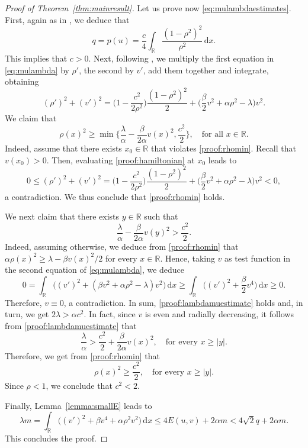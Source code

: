 \documentclass[11pt]{article}
\newcommand{\R}{\mathbb{R}}
\renewcommand{\d}{\,\mathrm{d}}
\theoremstyle{plain}
\theoremstyle{definition}
\theoremstyle{remark}
\numberwithin{equation}{section}
\begin{document}
{\begin{proof}[Proof of Theorem~\ref{thm:mainresult}]
Let us prove now \eqref{eq:mulambdaestimates}. First, again as in \cite{dLMar2022}, we deduce that
    \[q=p(u)=\frac{c}{4}\int_\R \frac{(1-\rho^2)^2}{\rho^2}\d x.\]
    This implies that $c>0$. Next, following \cite{Maris2006}, we multiply the first equation in \eqref{eq:mulambda} by $\rho'$, the second by $v'$, add them together and integrate, obtaining 
    \begin{equation}\label{proof:hamiltonian}
    (\rho')^2+(v')^2=\Big(1-\frac{c^2}{2\rho^2}\Big)\frac{(1-\rho^2)^2}{2} + \Big(\frac{\beta}{2}v^2+\alpha\rho^2-\lambda\Big)v^2.
    \end{equation}
    We claim that
    \begin{equation}\label{proof:rhomin}
    \rho(x)^2\geq \min\Big\{\frac{\lambda}{\alpha}-\frac{\beta}{2\alpha}v(x)^2,\frac{c^2}{2}\Big\},\quad\text{for all }x\in\R.
    \end{equation}
    Indeed, assume that there exists $x_0\in\R$ that violates \eqref{proof:rhomin}. Recall that $v(x_0)>0$. Then, evaluating \eqref{proof:hamiltonian} at $x_0$ leads to 
    \[0\leq (\rho')^2+(v')^2=\Big(1-\frac{c^2}{2\rho^2}\Big)\frac{(1-\rho^2)^2}{2} + \Big(\frac{\beta}{2}v^{2}+\alpha\rho^2-\lambda\Big)v^2< 0,\]
    a contradiction. We thus conclude that \eqref{proof:rhomin} holds.

    We next claim that there exists $y\in\R$ such that
    \begin{equation}\label{proof:lambdamuestimate}
        \frac{\lambda}{\alpha} - \frac{\beta}{2\alpha}v(y)^{2}>\frac{c^2}{2}.
    \end{equation}
    Indeed, assuming otherwise, we deduce from \eqref{proof:rhomin} that $\alpha\rho(x)^2\geq \lambda-\beta v(x)^{2}/2$ for every $x\in\R$. Hence, taking $v$ as test function in the second equation of \eqref{eq:mulambda}, we deduce
    \[0=\int_\R\Big((v')^2 + (\beta v^2+\alpha\rho^2-\lambda)v^2\Big)\d x\geq \int_\R\Big ((v')^2+\frac{\beta}{2}v^4\Big)\d x\geq 0.\]
    Therefore, $v\equiv 0$, a contradiction. In sum, \eqref{proof:lambdamuestimate} holds and, in turn, we get $2\lambda>\alpha c^2$. In fact, since $v$ is even and radially decreasing, it follows from \eqref{proof:lambdamuestimate} that 
    \[\frac{\lambda}{\alpha}>\frac{c^2}{2}+\frac{\beta}{2\alpha}v(x)^{2},\quad\text{for every }x\geq|y|.\]
    Therefore, we get from \eqref{proof:rhomin} that 
    \[\rho(x)^2\geq\frac{c^2}{2},\quad\text{for every }x\geq|y|.\]
    Since $\rho<1$, we conclude that $c^2<2$.

    Finally, Lemma~\ref{lemma:smallE} leads to
    \[\lambda m = \int_\R\Big((v')^2+\beta v^4 + \alpha \rho^2 v^2\Big)\d x\leq 4 E(u,v) + 2\alpha m<4\sqrt{2}q+ 2\alpha m.\]
    This concludes the proof.
\end{proof}


}
\end{document}
